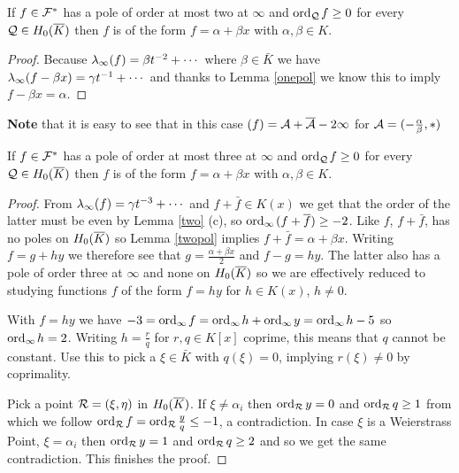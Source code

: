 \documentclass[english,11pt,a4paper]{article}
\begin{document}
\begin{lemma}\label{twopol}
  If $f \in \mathcal{F}^*$ has a pole of order at most two at $\infty$ and $\text{ord}_{\mathcal{Q}}\hspace{0.4mm} f \geq 0$ for every $\mathcal{Q} \in H_0(\overline K)$ then $f$ is of the form $f = \alpha + \beta x$ with $\alpha, \beta \in K$.
  \begin{proof}
    Because $\lambda_{\infty} (f) = \beta t^{-2} + \cdots$ where $\beta \in \bar K$ we have $\lambda_{\infty} (f - \beta x)= \gamma t^{-1} + \cdots$ and thanks to Lemma \ref{onepol} we know this to imply $f - \beta x = \alpha$.
  \end{proof}
  \textbf{Note} that it is easy to see that in this case $(f) = \mathcal{A} + \overline {\mathcal{A}} -2 \infty$ for $\mathcal{A} = ( - \frac \alpha \beta , * )$
\end{lemma}

\begin{lemma}\label{threepol}
  If $f \in \mathcal{F}^*$ has a pole of order at most three at $\infty$ and $\text{ord}_{\mathcal{Q}}\hspace{0.4mm} f \geq 0$ for every $\mathcal{Q} \in H_0(\overline K)$ then $f$ is of the form $f = \alpha + \beta x$ with $\alpha, \beta \in K$.
  \begin{proof}
    From $\lambda_{\infty} (f) = \gamma t^{-3} + \cdots$ and $f + \bar f \in K(x)$ we get that the order of the latter must be even by Lemma \ref{two} (c), so $\text{ord}_{\infty}\hspace{0.4mm} (f+ \overline f)  \geq -2$. Like $f$, $f + \bar f$, has no poles on $H_0(\overline K)$ so Lemma \ref{twopol} implies $f + \bar f = \alpha + \beta x$. Writing $f = g + hy$ we therefore see that $g = \frac{\alpha + \beta x}{2}$ and $f - g = hy$. The latter also has a pole of order three at $\infty$ and none on $H_0(\overline K)$ so we are effectively reduced to studying functions $f$ of the form $f = hy$ for $h \in K(x)$, $h \neq 0$.

    With $f = h y$ we have $-3 = \text{ord}_{\infty}\hspace{0.4mm} f = \text{ord}_{\infty}\hspace{0.4mm} h + \text{ord}_{\infty}\hspace{0.4mm} y = \text{ord}_{\infty}\hspace{0.4mm} h - 5$ so $\text{ord}_{\infty}\hspace{0.4mm} h = 2$. Writing $h = \frac r q$ for $r, q \in K[x]$ coprime, this means that $q$ cannot be constant. Use this to pick a $\xi \in \bar K$ with $q(\xi) = 0$, implying $r(\xi) \neq 0$ by coprimality.

    Pick a point $\mathcal{R} = (\xi, \eta)$ in $H_0(\overline K)$. If $\xi \neq \alpha_i$ then $\text{ord}_{\mathcal{R}} \hspace{0.5mm} y = 0$ and $\text{ord}_{\mathcal{R}} \hspace{0.5mm} q \geq 1$ from which we follow $\text{ord}_{\mathcal{R}} \hspace{0.4mm} f = \text{ord}_{\mathcal{R}} \hspace{0.4mm} \frac y q \leq -1$, a contradiction. In case $\xi$ is a Weierstrass Point, $\xi = \alpha_i$ then $\text{ord}_{\mathcal{R}} \hspace{0.5mm} y = 1$ and $\text{ord}_{\mathcal{R}} \hspace{0.5mm} q \geq 2$ and so we get the same contradiction. This finishes the proof.
  \end{proof}
\end{lemma}
\end{document}
